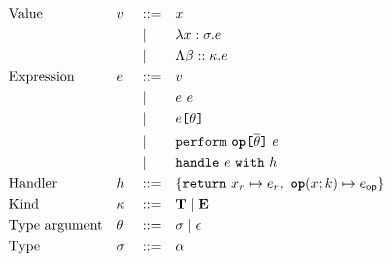 \begin{figure}[h]
    \begin{align*}
         & \text{Value}                     &  & v        &  & ::=  &  & x                                                                                                    & \\
         &                                  &  &          &  & \mid &  & \lambda x : \sigma. e                                                                                & \\
         &                                  &  &          &  & \mid &  & \Lambda \beta :: \kappa. e                                                                           & \\
         & \text{Expression}                &  & e        &  & ::=  &  & v                                                                                                    & \\
         &                                  &  &          &  & \mid &  & e~e                                                                                                  & \\
         &                                  &  &          &  & \mid &  & e\bktt{\theta}                                                                                        & \\
         &                                  &  &          &  & \mid &  & \texttt{perform}~\textbf{\texttt{op}}\bktt{\overline{\theta}}~e                                       & \\
         &                                  &  &          &  & \mid &  & \texttt{handle}~e~\texttt{with}~h                                                                    & \\
         & \text{Handler}                   &  & h        &  & ::=  &  & \{ \texttt{return}~x_r \mapsto e_r,\ \textbf{\texttt{op}}(x; k) \mapsto e_{\mathsf{op}} \} & \\
         & \text{Kind}                      &  & \kappa   &  & ::=  &  & \mathbf{T}\mid\mathbf{E}                                                                                 & \\
         & \text{Type argument}             &  & \theta   &  & ::=  &  & \sigma\mid\epsilon                                                                                   & \\
         & \text{Type}                      &  & \sigma   &  & ::=  &  & \alpha                                                                                               & \\

\end{align*}
\end{figure}
